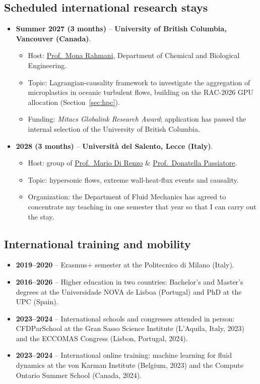 \documentclass[11pt]{article}
\begin{document}
\subsection{Scheduled international research stays}\label{sec:stays-sched}
\begin{itemize}
  \item \textbf{Summer 2027 (3 months)} -- \textbf{University of British
  Columbia, Vancouver (Canada)}.
  \begin{itemize}
    \item Host: \href{https://chbe.ubc.ca/mona-rahmani/}{Prof.\ Mona Rahmani},
    Department of Chemical and Biological Engineering.
    \item Topic: Lagrangian-causality framework to investigate the aggregation of
    microplastics in oceanic turbulent flows, building on the RAC-2026 GPU allocation (Section~\ref{sec:hpc}).
    \item Funding: \emph{Mitacs Globalink Research Award}; application has
    passed the internal selection of the University of British Columbia.
  \end{itemize}
  \item \textbf{2028 (3 months)} -- \textbf{Universit\`a del Salento, Lecce
  (Italy)}.
  \begin{itemize}
    \item Host: group of
    \href{https://www.unisalento.it/scheda-utente/-/people/mario.direnzo}{Prof.\ Mario Di Renzo} \& \href{https://www.unisalento.it/scheda-utente/-/people/donatella.passiatore}{Prof.\ Donatella Passiatore}.
    \item Topic: hypersonic flows, extreme wall-heat-flux events and causality.
    \item Organization: the Department of Fluid Mechanics has agreed to concentrate
    my teaching in one semester that year so that I can carry out the stay.
  \end{itemize}
\end{itemize}

\subsection{International training and mobility}
\begin{itemize}
  \item \textbf{2019--2020} -- Erasmus+ semester at the Politecnico di Milano (Italy).
  \item \textbf{2016--2026} -- Higher education in two countries: Bachelor's and Master's
  degrees at the Universidade NOVA de Lisboa (Portugal) and PhD at the UPC (Spain).
  \item \textbf{2023--2024} -- International schools and congresses attended in person:
  CFDParSchool at the Gran Sasso Science Institute (L'Aquila, Italy, 2023) and the ECCOMAS
  Congress (Lisbon, Portugal, 2024).
  \item \textbf{2023--2024} -- International online training: machine learning for fluid
  dynamics at the von Karman Institute (Belgium, 2023) and the Compute Ontario Summer School
  (Canada, 2024).
\end{itemize}
\end{document}
